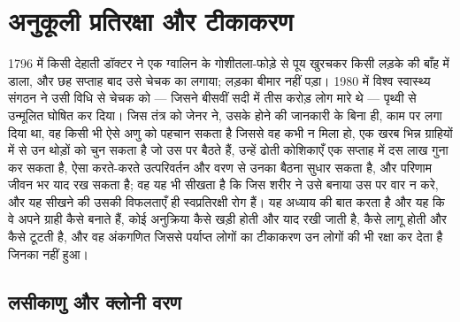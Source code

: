 \chapter{अनुकूली प्रतिरक्षा और टीकाकरण}\label{ch:b3:adaptive-immunity}

1796 में किसी देहाती डॉक्टर ने एक ग्वालिन के गोशीतला-फोड़े से पूय
खुरचकर किसी लड़के की बाँह में डाला, और छह सप्ताह बाद उसे चेचक का 
लगाया; लड़का बीमार नहीं पड़ा। 1980 में विश्व स्वास्थ्य संगठन ने उसी
विधि से चेचक को --- जिसने बीसवीं सदी में तीस करोड़ लोग मारे थे ---
पृथ्वी से उन्मूलित घोषित कर दिया। जिस तंत्र को जेनर ने, उसके होने की
जानकारी के बिना ही, काम पर लगा दिया था, वह किसी भी ऐसे अणु को पहचान
सकता है जिससे वह कभी न मिला हो, एक खरब भिन्न ग्राहियों में से उन थोड़ों
को चुन सकता है जो उस पर बैठते हैं, उन्हें ढोती कोशिकाएँ एक सप्ताह में
दस लाख गुना कर सकता है, ऐसा करते-करते उत्परिवर्तन और वरण से उनका बैठना
सुधार सकता है, और परिणाम जीवन भर याद रख सकता है; वह यह भी सीखता है कि
जिस शरीर ने उसे बनाया उस पर वार न करे, और यह सीखने की उसकी विफलताएँ ही
स्वप्रतिरक्षी रोग हैं। यह अध्याय  की बात करता है और यह कि वे
अपने ग्राही कैसे बनाते हैं, कोई अनुक्रिया कैसे खड़ी होती और याद रखी जाती
है,  कैसे लागू होती और कैसे टूटती है, और वह अंकगणित जिससे
पर्याप्त लोगों का टीकाकरण उन लोगों की भी रक्षा कर देता है जिनका नहीं
हुआ।

\section{लसीकाणु और क्लोनी वरण}

